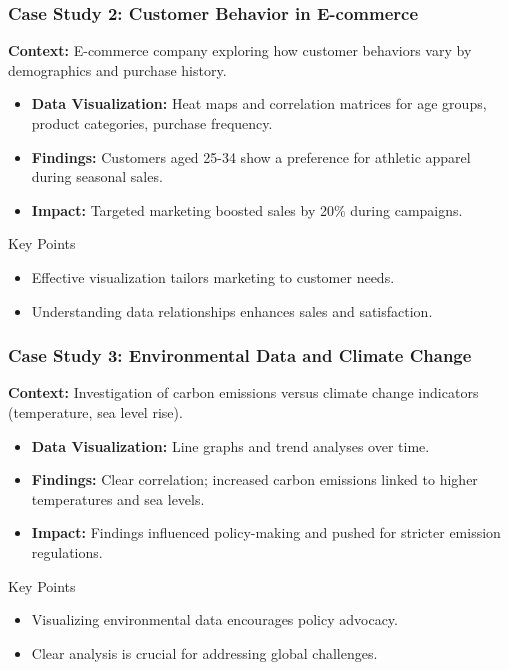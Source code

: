 \documentclass[aspectratio=169]{beamer}
\begin{document}
\begin{frame}[fragile]
    \frametitle{Case Study 2: Customer Behavior in E-commerce}
    \textbf{Context:} E-commerce company exploring how customer behaviors vary by demographics and purchase history.

    \begin{itemize}
        \item \textbf{Data Visualization:} Heat maps and correlation matrices for age groups, product categories, purchase frequency.
        \item \textbf{Findings:} Customers aged 25-34 show a preference for athletic apparel during seasonal sales.
        \item \textbf{Impact:} Targeted marketing boosted sales by 20\% during campaigns.
    \end{itemize}

    \begin{block}{Key Points}
        \begin{itemize}
            \item Effective visualization tailors marketing to customer needs.
            \item Understanding data relationships enhances sales and satisfaction.
        \end{itemize}
    \end{block}
\end{frame}

\begin{frame}[fragile]
    \frametitle{Case Study 3: Environmental Data and Climate Change}
    \textbf{Context:} Investigation of carbon emissions versus climate change indicators (temperature, sea level rise).

    \begin{itemize}
        \item \textbf{Data Visualization:} Line graphs and trend analyses over time.
        \item \textbf{Findings:} Clear correlation; increased carbon emissions linked to higher temperatures and sea levels.
        \item \textbf{Impact:} Findings influenced policy-making and pushed for stricter emission regulations.
    \end{itemize}

    \begin{block}{Key Points}
        \begin{itemize}
            \item Visualizing environmental data encourages policy advocacy.
            \item Clear analysis is crucial for addressing global challenges.
        \end{itemize}
    \end{block}
\end{frame}
\end{document}
